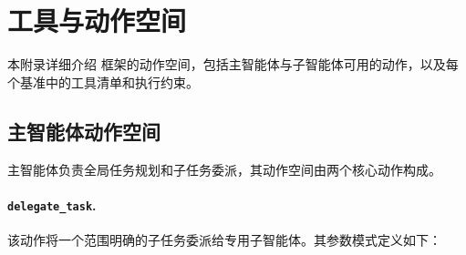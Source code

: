 







\section{工具与动作空间}
\label{app:action_space}


本附录详细介绍 \our{} 框架的动作空间，包括主智能体与子智能体可用的动作，以及每个基准中的工具清单和执行约束。

\subsection{主智能体动作空间}

主智能体负责全局任务规划和子任务委派，其动作空间由两个核心动作构成。

\paragraph{\texttt{delegate\_task}.}
该动作将一个范围明确的子任务委派给专用子智能体。其参数模式定义如下：

